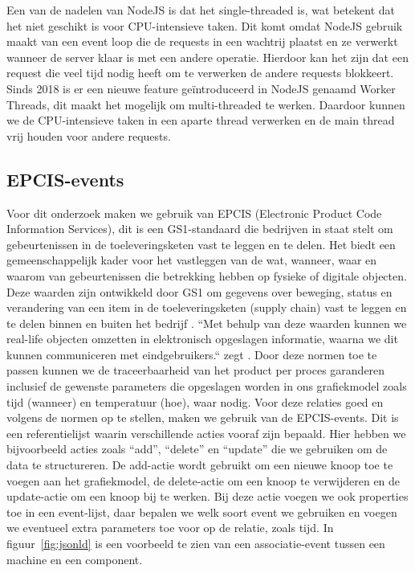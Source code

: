 Een van de nadelen van NodeJS is dat het single-threaded is, wat betekent dat het niet geschikt is voor CPU-intensieve taken.
Dit komt omdat NodeJS gebruik maakt van een event loop die de requests in een wachtrij plaatst en ze verwerkt wanneer de server klaar is met een andere operatie.
Hierdoor kan het zijn dat een request die veel tijd nodig heeft om te verwerken de andere requests blokkeert.
Sinds 2018 is er een nieuwe feature geïntroduceerd in NodeJS genaamd Worker Threads, dit maakt het mogelijk om multi-threaded te werken.
Daardoor kunnen we de CPU-intensieve taken in een aparte thread verwerken en de main thread vrij houden voor andere requests.

\subsection{EPCIS-events}
Voor dit onderzoek maken we gebruik van EPCIS (Electronic Product Code Information Services), dit is een GS1-standaard die bedrijven in staat stelt om gebeurtenissen in de toeleveringsketen vast te leggen en te delen. 
Het biedt een gemeenschappelijk kader voor het vastleggen van de wat, wanneer, waar en waarom van gebeurtenissen die betrekking hebben op fysieke of digitale objecten. 
Deze waarden zijn ontwikkeld door GS1 om gegevens over beweging, status en verandering van een item in de toeleveringsketen (supply chain) vast te leggen en te delen binnen en buiten het bedrijf \autocite{Devins}.
``Met behulp van deze waarden kunnen we real-life objecten omzetten in elektronisch opgeslagen informatie, waarna we dit kunnen communiceren met eindgebruikers.`` zegt \textcite{Devins}.
Door deze normen toe te passen kunnen we de traceerbaarheid van het product per proces garanderen inclusief de gewenste parameters die opgeslagen worden in ons grafiekmodel zoals tijd (wanneer) en temperatuur (hoe), waar nodig.
Voor deze relaties goed en volgens de normen op te stellen, maken we gebruik van de EPCIS-events. Dit is een referentielijst waarin verschillende acties vooraf zijn bepaald.
Hier hebben we bijvoorbeeld acties zoals ``add'', ``delete'' en ``update'' die we gebruiken om de data te structureren.
De add-actie wordt gebruikt om een nieuwe knoop toe te voegen aan het grafiekmodel, de delete-actie om een knoop te verwijderen en de update-actie om een knoop bij te werken.
Bij deze actie voegen we ook properties toe in een event-lijst, daar bepalen we welk soort event we gebruiken en voegen we eventueel extra parameters toe voor op de relatie, zoals tijd.
In figuur~\ref{fig:jsonld} is een voorbeeld te zien van een associatie-event tussen een machine en een component.

